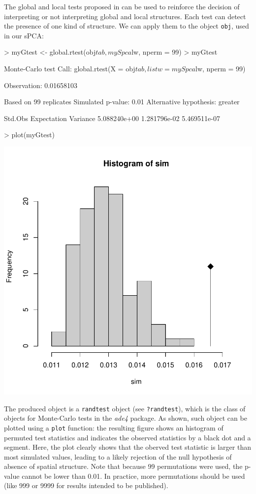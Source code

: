 \documentclass{article}
\begin{document}
The global and local tests proposed in \cite{tjart04} can
be used to reinforce the decision of interpreting or not
interpreting global and local structures.
Each test can detect the presence of one kind of structure.
We can apply them to the object \texttt{obj}, used in our sPCA:
\begin{Schunk}
\begin{Sinput}
> myGtest <- global.rtest(obj$tab, mySpca$lw, nperm = 99)
> myGtest
\end{Sinput}
\begin{Soutput}
Monte-Carlo test
Call: global.rtest(X = obj$tab, listw = mySpca$lw, nperm = 99)

Observation: 0.01658103 

Based on 99 replicates
Simulated p-value: 0.01 
Alternative hypothesis: greater 

     Std.Obs  Expectation     Variance 
5.088240e+00 1.281796e-02 5.469511e-07 
\end{Soutput}
\begin{Sinput}
> plot(myGtest)
\end{Sinput}
\end{Schunk}
\includegraphics{figs/spca-globalrtest}

\noindent The produced object is a \texttt{randtest} object (see
\texttt{?randtest}), which is the class of objects for Monte-Carlo
tests in the \textit{ade4} package.
As shown, such object can be plotted using a \texttt{plot} function:
the resulting figure shows an histogram of permuted test statistics
and indicates the observed statistics by a black dot and a segment.
Here, the plot clearly shows that the oberved test statistic is larger
than most simulated values, leading to a likely rejection of
the null hypothesis of absence of spatial structure.
Note that because 99 permutations were used, the p-value cannot be
lower than 0.01.
In practice, more permutations should be used (like 999 or 9999 for results
intended to be published).
\end{document}
